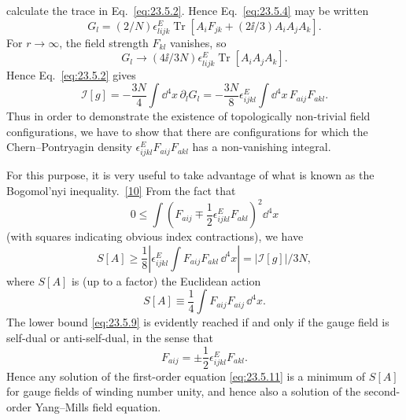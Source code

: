 calculate the trace in Eq.~\eqref{eq:23.5.2}. Hence
Eq.~\eqref{eq:23.5.4} may be written
\begin{equation}
G_l=(2/N)\epsilon^E_{lijk}\operatorname{Tr}\left[
A_iF_{jk}+(2\ii/3)A_iA_jA_k
\right].
\tag{23.5.6}\label{eq:23.5.6}
\end{equation}
For $r\to\infty$, the field strength $F_{kl}$ vanishes, so
\begin{equation}
G_l\longrightarrow(4\ii/3N)\epsilon^E_{lijk}
\operatorname{Tr}[A_iA_jA_k].
\tag{23.5.7}\label{eq:23.5.7}
\end{equation}
Hence Eq.~\eqref{eq:23.5.2} gives
\begin{equation}
\mathcal I[g]=-\frac{3N}{4}\int \dd^4x\,\partial_lG_l
=-\frac{3N}{8}\epsilon^E_{ijkl}
\int \dd^4x\,F_{a ij}F_{a kl}.
\tag{23.5.8}\label{eq:23.5.8}
\end{equation}
Thus in order to demonstrate the existence of topologically non-trivial
field configurations, we have to show that there are configurations for
which the Chern--Pontryagin density
$\epsilon^E_{ijkl}F_{a ij}F_{a kl}$ has a non-vanishing
integral.

For this purpose, it is very useful to take advantage of what is known as
the Bogomol'nyi inequality.~\hyperref[ch23-ref-10]{[10]} From the fact
that
\[
0\leq\int\left(
F_{a ij}\mp\frac12\epsilon^E_{ijkl}F_{a kl}
\right)^2\dd^4x
\]
(with squares indicating obvious index contractions), we have
\begin{equation}
S[A]\geq\frac18\left|
\epsilon^E_{ijkl}\int F_{a ij}F_{a kl}\,\dd^4x
\right|
=|\mathcal I[g]|/3N,
\tag{23.5.9}\label{eq:23.5.9}
\end{equation}
where $S[A]$ is (up to a factor) the Euclidean action
\begin{equation}
S[A]\equiv\frac14\int F_{a ij}F_{a ij}\,\dd^4x.
\tag{23.5.10}\label{eq:23.5.10}
\end{equation}
The lower bound \eqref{eq:23.5.9} is evidently reached if and only if the
gauge field is self-dual or anti-self-dual, in the sense that
\begin{equation}
F_{a ij}=\pm\frac12\epsilon^E_{ijkl}F_{a kl}.
\tag{23.5.11}\label{eq:23.5.11}
\end{equation}
Hence any solution of the first-order equation \eqref{eq:23.5.11} is a
minimum of $S[A]$ for gauge fields of winding number unity, and hence
also a solution of the second-order Yang--Mills field equation.

